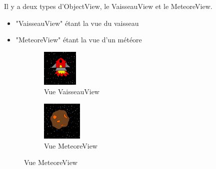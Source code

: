 \documentclass{article}
\begin{document}
Il y a deux types d'ObjectView, le VaisseauView et le MeteoreView.
\begin{itemize}
    \item "VaisseauView" étant la vue du vaisseau
    \item "MeteoreView" étant la vue d'un météore
\end{itemize}
\begin{figure}
\centering
 \begin{subfigure}[b]{0.4\textwidth}
  \includegraphics[width=\textwidth]{images/vaisseauView.png}
  \caption{Vue VaisseauView}
 \end{subfigure}
  \begin{subfigure}[b]{0.4\textwidth}
  \includegraphics[width=\textwidth]{images/meteoreView.png}
  \caption{Vue MeteoreView}
 \end{subfigure}
\end{figure}
\end{document}
